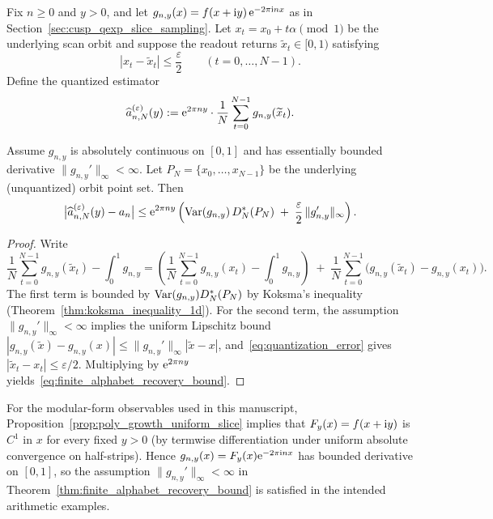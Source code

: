 \begin{definition}
\label{def:quantized_scan_estimator}
Fix $n\ge 0$ and $y>0$, and let $g_{n,y}(x)=f(x+\mathrm{i} y)\,\mathrm{e}^{-2\pi\mathrm{i} n x}$ as in Section~\ref{sec:cusp_qexp_slice_sampling}.
Let $x_t=x_0+t\alpha\pmod 1$ be the underlying scan orbit and suppose the readout returns $\widetilde x_t\in[0,1)$ satisfying
\begin{equation}
\label{eq:quantization_error}
|x_t-\widetilde x_t|\le \frac{\varepsilon}{2}\qquad (t=0,\ldots,N-1).
\end{equation}
Define the quantized estimator
\begin{equation}
\label{eq:quantized_scan_estimator}
\widehat a_{n,N}^{(\varepsilon)}(y)
:=\mathrm{e}^{2\pi n y}\cdot\frac{1}{N}\sum_{t=0}^{N-1} g_{n,y}(\widetilde x_t).
\end{equation}
\end{definition}

\begin{theorem}
\label{thm:finite_alphabet_recovery_bound}
Assume $g_{n,y}$ is absolutely continuous on $[0,1]$ and has essentially bounded derivative $\|g_{n,y}'\|_\infty<\infty$. Let $P_N=\{x_0,\ldots,x_{N-1}\}$ be the underlying (unquantized) orbit point set. Then
\begin{equation}
\label{eq:finite_alphabet_recovery_bound}
\big|\widehat a_{n,N}^{(\varepsilon)}(y)-a_n\big|
\le \mathrm{e}^{2\pi n y}\left(\mathrm{Var}(g_{n,y})\,D_N^\ast(P_N)\;+\;\frac{\varepsilon}{2}\,\|g_{n,y}'\|_\infty\right).
\end{equation}
\end{theorem}
\begin{proof}
Write
\[
\frac{1}{N}\sum_{t=0}^{N-1} g_{n,y}(\widetilde x_t)-\int_0^1 g_{n,y}
=\left(\frac{1}{N}\sum_{t=0}^{N-1} g_{n,y}(x_t)-\int_0^1 g_{n,y}\right)
\;+\;\frac{1}{N}\sum_{t=0}^{N-1}\big(g_{n,y}(\widetilde x_t)-g_{n,y}(x_t)\big).
\]
The first term is bounded by $\mathrm{Var}(g_{n,y})D_N^\ast(P_N)$ by Koksma's inequality (Theorem~\ref{thm:koksma_inequality_1d}).
For the second term, the assumption $\|g_{n,y}'\|_\infty<\infty$ implies the uniform Lipschitz bound $|g_{n,y}(\widetilde x)-g_{n,y}(x)|\le \|g_{n,y}'\|_\infty|\widetilde x-x|$, and~\eqref{eq:quantization_error} gives $|\widetilde x_t-x_t|\le \varepsilon/2$.
Multiplying by $\mathrm{e}^{2\pi n y}$ yields~\eqref{eq:finite_alphabet_recovery_bound}.
\end{proof}

\begin{remark}
For the modular-form observables used in this manuscript, Proposition~\ref{prop:poly_growth_uniform_slice} implies that $F_y(x)=f(x+\mathrm{i} y)$ is $C^1$ in $x$ for every fixed $y>0$ (by termwise differentiation under uniform absolute convergence on half-strips). Hence $g_{n,y}(x)=F_y(x)\mathrm{e}^{-2\pi\mathrm{i} n x}$ has bounded derivative on $[0,1]$, so the assumption $\|g_{n,y}'\|_\infty<\infty$ in Theorem~\ref{thm:finite_alphabet_recovery_bound} is satisfied in the intended arithmetic examples.
\end{remark}

